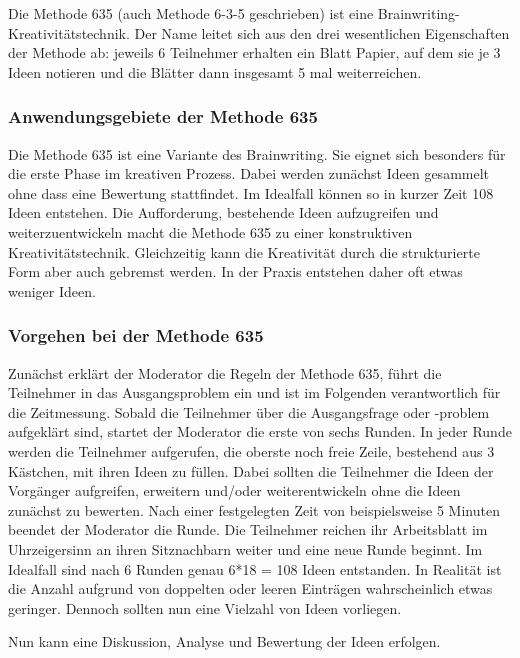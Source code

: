 Die Methode 635 (auch Methode 6-3-5 geschrieben) ist eine Brainwriting-Kre\-ati\-vi\-täts\-technik. Der Name leitet sich aus den drei wesentlichen Eigenschaften der Methode ab: jeweils 6 Teilnehmer erhalten ein Blatt Papier, auf dem sie je 3 Ideen notieren und die Blätter dann insgesamt 5 mal weiterreichen.

\subsubsection*{Anwendungsgebiete der Methode 635}
Die Methode 635 ist eine Variante des Brainwriting. Sie eignet sich besonders für die erste Phase im kreativen Prozess. Dabei werden zunächst Ideen gesammelt ohne dass eine Bewertung stattfindet. Im Idealfall können so in kurzer Zeit 108 Ideen entstehen. Die Aufforderung, bestehende Ideen aufzugreifen und weiterzuentwickeln macht die Methode 635 zu einer konstruktiven Kreativitätstechnik. Gleichzeitig kann die Kreativität durch die strukturierte Form aber auch gebremst werden. In der Praxis entstehen daher oft etwas weniger Ideen.

\subsubsection*{Vorgehen bei der Methode 635}
Zunächst erklärt der Moderator die Regeln der Methode 635, führt die Teilnehmer in das Ausgangsproblem ein und ist im Folgenden verantwortlich für die Zeitmessung. Sobald die Teilnehmer über die Ausgangsfrage oder -problem aufgeklärt sind, startet der Moderator die erste von sechs Runden. In jeder Runde werden die Teilnehmer aufgerufen, die oberste noch freie Zeile, bestehend aus 3 Kästchen, mit ihren Ideen zu füllen. Dabei sollten die Teilnehmer die Ideen der Vorgänger aufgreifen, erweitern und/oder weiterentwickeln ohne die Ideen zunächst zu bewerten. Nach einer festgelegten Zeit von beispielsweise 5 Minuten beendet der Moderator die Runde. Die Teilnehmer reichen ihr Arbeitsblatt im Uhrzeigersinn an ihren Sitznachbarn weiter und eine neue Runde beginnt. Im Idealfall sind nach 6 Runden genau 6*18 = 108 Ideen entstanden. In Realität ist die Anzahl aufgrund von doppelten oder leeren Einträgen wahrscheinlich etwas geringer. Dennoch sollten nun eine Vielzahl von Ideen vorliegen.


Nun kann eine Diskussion, Analyse und Bewertung der Ideen erfolgen.

\newpage


\newpage

